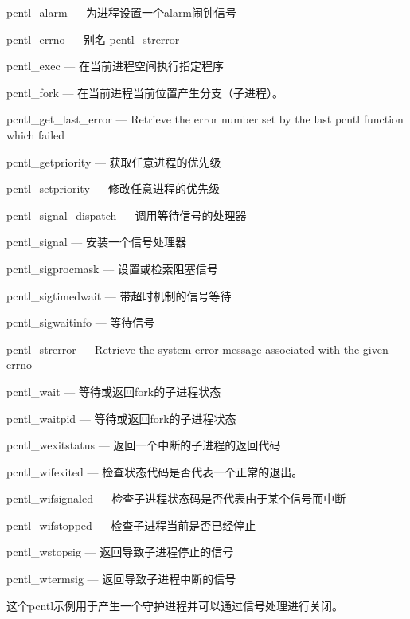 \begin{compactitem}
\item pcntl\_alarm — 为进程设置一个alarm闹钟信号
\item pcntl\_errno — 别名 pcntl\_strerror
\item pcntl\_exec — 在当前进程空间执行指定程序
\item pcntl\_fork — 在当前进程当前位置产生分支（子进程）。
\item pcntl\_get_last_error — Retrieve the error number set by the last pcntl function which failed
\item pcntl\_getpriority — 获取任意进程的优先级
\item pcntl\_setpriority — 修改任意进程的优先级
\item pcntl\_signal_dispatch — 调用等待信号的处理器
\item pcntl\_signal — 安装一个信号处理器
\item pcntl\_sigprocmask — 设置或检索阻塞信号
\item pcntl\_sigtimedwait — 带超时机制的信号等待
\item pcntl\_sigwaitinfo — 等待信号
\item pcntl\_strerror — Retrieve the system error message associated with the given errno
\item pcntl\_wait — 等待或返回fork的子进程状态
\item pcntl\_waitpid — 等待或返回fork的子进程状态
\item pcntl\_wexitstatus — 返回一个中断的子进程的返回代码
\item pcntl\_wifexited — 检查状态代码是否代表一个正常的退出。
\item pcntl\_wifsignaled — 检查子进程状态码是否代表由于某个信号而中断
\item pcntl\_wifstopped — 检查子进程当前是否已经停止
\item pcntl\_wstopsig — 返回导致子进程停止的信号
\item pcntl\_wtermsig — 返回导致子进程中断的信号
\end{compactitem}


这个pcntl示例用于产生一个守护进程并可以通过信号处理进行关闭。


